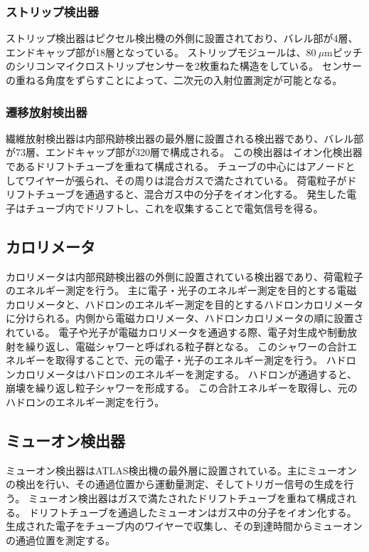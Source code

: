 \subsubsection{ストリップ検出器}
ストリップ検出器はピクセル検出機の外側に設置されており、バレル部が4層、エンドキャップ部が18層となっている。
ストリップモジュールは、80$~\mu$mピッチのシリコンマイクロストリップセンサーを2枚重ねた構造をしている。
センサーの重ねる角度をずらすことによって、二次元の入射位置測定が可能となる。

\subsubsection{遷移放射検出器}
繊維放射検出器は内部飛跡検出器の最外層に設置される検出器であり、バレル部が73層、エンドキャップ部が320層で構成される。
この検出器はイオン化検出器であるドリフトチューブを重ねて構成される。
チューブの中心にはアノードとしてワイヤーが張られ、その周りは混合ガスで満たされている。
荷電粒子がドリフトチューブを通過すると、混合ガス中の分子をイオン化する。
発生した電子はチューブ内でドリフトし、これを収集することで電気信号を得る。

\subsection{カロリメータ}
カロリメータは内部飛跡検出器の外側に設置されている検出器であり、荷電粒子のエネルギー測定を行う。
主に電子・光子のエネルギー測定を目的とする電磁カロリメータと、ハドロンのエネルギー測定を目的とするハドロンカロリメータに分けられる。内側から電磁カロリメータ、ハドロンカロリメータの順に設置されている。
電子や光子が電磁カロリメータを通過する際、電子対生成や制動放射を繰り返し、電磁シャワーと呼ばれる粒子群となる。
このシャワーの合計エネルギーを取得することで、元の電子・光子のエネルギー測定を行う。
ハドロンカロリメータはハドロンのエネルギーを測定する。
ハドロンが通過すると、崩壊を繰り返し粒子シャワーを形成する。
この合計エネルギーを取得し、元のハドロンのエネルギー測定を行う。

\subsection{ミューオン検出器}
ミューオン検出器はATLAS検出機の最外層に設置されている。主にミューオンの検出を行い、その通過位置から運動量測定、そしてトリガー信号の生成を行う。
ミューオン検出器はガスで満たされたドリフトチューブを重ねて構成される。
ドリフトチューブを通過したミューオンはガス中の分子をイオン化する。
生成された電子をチューブ内のワイヤーで収集し、その到達時間からミューオンの通過位置を測定する。

